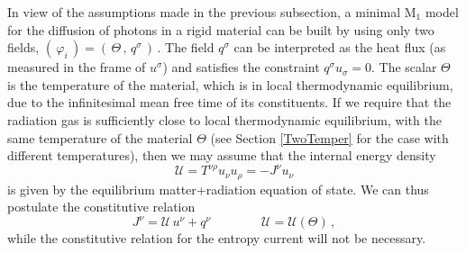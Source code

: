 \documentclass[a4paper, amsfonts, amssymb, amsmath, reprint, twocolumn, showkeys, nofootinbib]{revtex4-2}
\begin{document}
In view of the assumptions made in the previous subsection, a minimal $\text{M}_1$ model for the diffusion of photons in a rigid material can be built by using only two fields,
$(\, \varphi_i \,)  =  (\,\Theta\, , \, q^\sigma\,) \,$.
The field $q^\sigma$ can be interpreted as the heat flux (as measured in the frame of $u^\sigma$) and satisfies the constraint $q^\sigma u_\sigma =0$.
The scalar $\Theta$ is the temperature of the material, which is in local thermodynamic equilibrium, due to the infinitesimal mean free time of its constituents. If we require that the radiation gas is sufficiently close to local thermodynamic equilibrium, with the same temperature of the material $\Theta$ (see Section \ref{TwoTemper} for the case with different temperatures), then we may assume that the internal energy density
\begin{equation}
\mathcal{U} = T^{\nu \rho}u_\nu u_\rho = -J^\nu u_\nu
\end{equation}   
is given by the equilibrium matter+radiation equation of state. We can thus postulate the  constitutive relation \cite{Eckart40}  
\begin{equation}\label{JnuJ}
J^\nu = \mathcal{U} \, u^\nu + q^\nu   \quad \quad \quad \quad
\mathcal{U}=\mathcal{U}(\Theta) \, ,
\end{equation}
while the constitutive relation for the entropy current will not be necessary.
\end{document}
